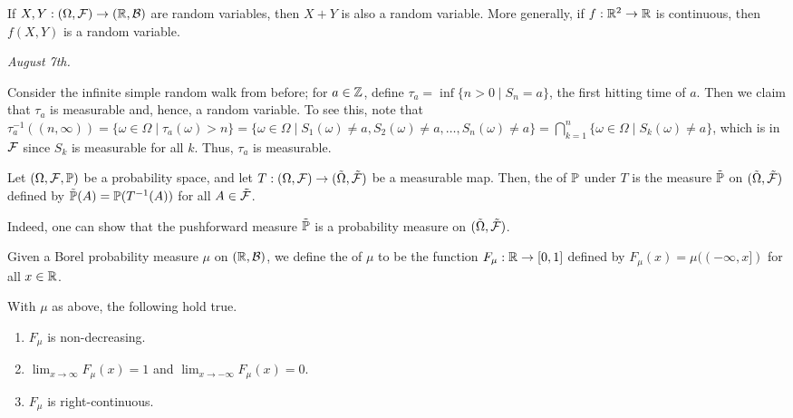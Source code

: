 \begin{lemma}
    If $X,Y:(\Omega,\mathcal{F}) \to (\mathbb{R},\mathcal{B})$ are random variables, then $X+Y$ is also a random variable. More generally, if $f:\mathbb{R}^{2} \to \mathbb{R}$ is continuous, then $f(X,Y)$ is a random variable.
\end{lemma}

\textit{August 7th.}

\begin{example}
    Consider the infinite simple random walk from before; for $a \in \mathbb{Z}$, define $\tau_{a} = \inf\{n > 0 \mid S_{n}=a\}$, the first hitting time of $a$. Then we claim that $\tau_{a}$ is measurable and, hence, a random variable. To see this, note that $\tau_{a}^{-1}((n,\infty)) = \{\omega \in \Omega \mid \tau_{a}(\omega) > n\} = \{\omega \in \Omega \mid S_{1}(\omega) \neq a, S_{2}(\omega) \neq a, \ldots, S_{n}(\omega) \neq a\} = \bigcap_{k=1}^{n}\{\omega \in \Omega \mid S_{k}(\omega) \neq a\}$, which is in $\mathcal{F}$ since $S_{k}$ is measurable for all $k$. Thus, $\tau_{a}$ is measurable.
\end{example}

\begin{definition}
    Let $(\Omega,\mathcal{F},\mathbb{P})$ be a probability space, and let $T:(\Omega,\mathcal{F}) \to (\tilde{\Omega},\tilde{\mathcal{F}})$ be a measurable map. Then, the  of $\mathbb{P}$ under $T$ is the measure $\tilde{\mathbb{P}}$ on $(\tilde{\Omega},\tilde{\mathcal{F}})$ defined by $\tilde{\mathbb{P}}(A) = \mathbb{P}(T^{-1}(A))$ for all $A \in \tilde{\mathcal{F}}$.
\end{definition}
Indeed, one can show that the pushforward measure $\tilde{\mathbb{P}}$ is a probability measure on $(\tilde{\Omega},\tilde{\mathcal{F}})$.

\begin{definition}
    Given a Borel probability measure $\mu$ on $(\mathbb{R},\mathcal{B})$, we define the  of $\mu$ to be the function $F_{\mu}:\mathbb{R} \to [0,1]$ defined by $F_{\mu}(x) = \mu((-\infty,x])$ for all $x \in \mathbb{R}$. 
\end{definition}

\begin{proposition}
    With $\mu$ as above, the following hold true.
    \begin{enumerate}
        \item $F_{\mu}$ is non-decreasing.
        \item $\lim_{x \to \infty} F_{\mu}(x) = 1$ and $\lim_{x \to -\infty} F_{\mu}(x) = 0$.
        \item $F_{\mu}$ is right-continuous.
    \end{enumerate}
\end{proposition}

